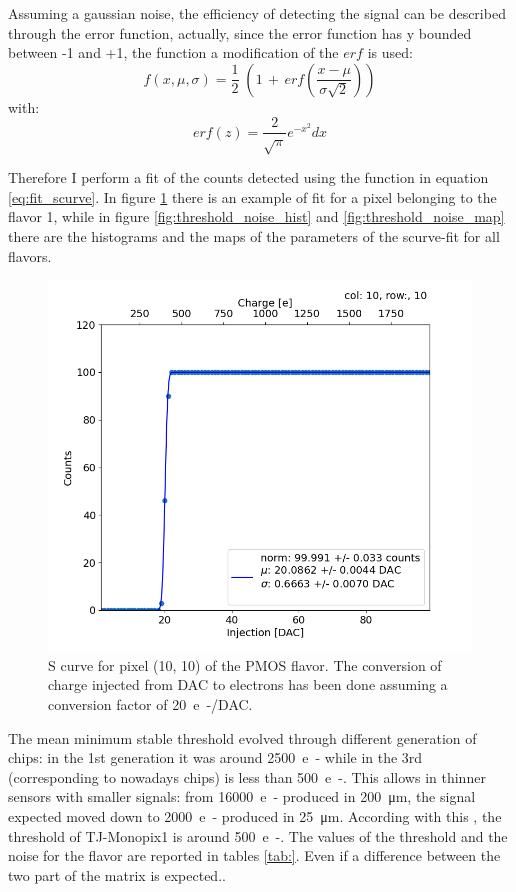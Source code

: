         Assuming a gaussian noise, the efficiency of detecting the signal can be described through the error function, actually, since the error function has y bounded between -1 and +1, the function a modification of the $erf$ is used: 
        \begin{equation}
            f(x, \mu, \sigma) = \frac{1}{2} \; \left(1\,+\,erf\left(\frac{x-\mu}{\sigma \sqrt{2}}\right)\right)
            \label{eq:fit_scurve}
        \end{equation}
        with: 
        \begin{equation}
            erf(z) = \frac{2}{\sqrt{\pi}} e^{-x^2} dx 
        \end{equation}   
         
        Therefore I perform a fit of the counts detected using the function in equation \ref{eq:fit_scurve}. In figure \ref{fig:scurve} there is an example of fit for a pixel belonging to the flavor 1, while in figure \ref{fig:threshold_noise_hist} and \ref{fig:threshold_noise_map} there are the histograms and the maps of the parameters of the scurve-fit for all flavors.
    
        \begin{figure}[h!]
            \centering
            \includegraphics[width=.6\linewidth]{figures/charaterization/scurve.png}
            \caption{S curve for pixel (10, 10) of the PMOS flavor. The conversion of charge injected from DAC to electrons has been done assuming a conversion factor of \SI{20}{e-/DAC}.}
            \label{fig:scurve}
        \end{figure}   

        The mean minimum stable threshold evolved through different generation of chips: in the 1st generation it was around \SI{2500}{e-} while in the 3rd (corresponding to nowadays chips) is less than \SI{500}{e-}. This allows in thinner sensors with smaller signals: from \SI{16000}{e-} produced in \SI{200}{\um}, the signal expected moved down to \SI{2000}{e-} produced in \SI{25}{\um}. According with this , the threshold of TJ-Monopix1 is around \SI{500}{e-}.
        The values of the threshold and the noise for the flavor are reported in tables \ref{tab:}.
        Even if a difference between the two part of the matrix is expected..
    
